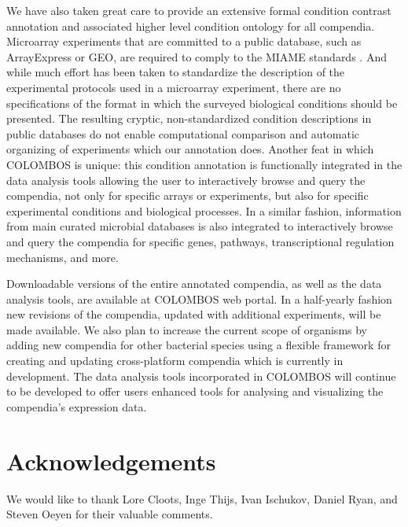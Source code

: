 We have also taken great care to provide an extensive formal condition contrast annotation and associated higher level condition ontology for all compendia. Microarray experiments that are committed to a public database, such as ArrayExpress or GEO, are required to comply to the MIAME standards \cite{Brazma2001, Brazma2009}. And while much effort has been taken to standardize the description of the experimental protocols used in a microarray experiment, there are no specifications of the format in which the surveyed biological conditions should be presented. The resulting cryptic, non-standardized condition descriptions in public databases do not enable computational comparison and automatic organizing of experiments which our annotation does. Another feat in which COLOMBOS is unique: this condition annotation is functionally integrated in the data analysis tools allowing the user to interactively browse and query the compendia, not only for specific arrays or experiments, but also for specific experimental conditions and biological processes. In a similar fashion, information from main curated microbial databases is also integrated to interactively browse and query the compendia for specific genes, pathways, transcriptional regulation mechanisms, and more. 

Downloadable versions of the entire annotated compendia, as well as the 
data analysis tools, are available at COLOMBOS web portal\cite{COLOMBOS}. 
In a half-yearly fashion new 
revisions of the compendia, updated with additional experiments, will be made 
available. We also plan to increase the current scope of organisms by adding 
new compendia for other bacterial species using a flexible framework for 
creating and updating cross-platform compendia which is currently in 
development. The data analysis tools incorporated in COLOMBOS will continue to 
be developed to offer users enhanced tools for analysing and visualizing the 
compendia's expression data.








\section{Acknowledgements}
We would like to thank Lore Cloots, Inge Thijs, Ivan Ischukov, Daniel Ryan, and Steven Oeyen for their valuable comments. 

\cleardoublepage


